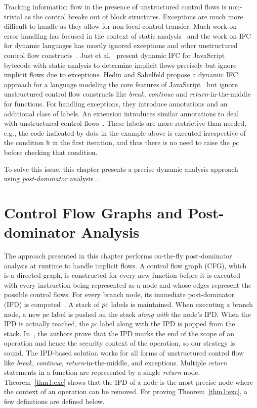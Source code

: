 Tracking information flow in the presence of unstructured control
flows is non-trivial as the control breaks out of block
structures. Exceptions are much more difficult to handle as they 
allow for non-local control transfer. Much work on error handling has
focused in the context of static analysis~\cite{myersJFlow,aslan_plas09}
and the work on IFC for dynamic languages has mostly ignored
exceptions and other unstructured control flow 
constructs~\cite{plas09,plas10,stagedIFC,guarnieri11ISSTA,acsac09}.
Just et al.~\cite{just11PLASTIC} present dynamic IFC for JavaScript
bytecode with static analysis to determine implicit flows precisely
but ignore implicit flows due to exceptions. Hedin and Sabelfeld
propose a dynamic IFC approach for a language 
modeling the core features of JavaScript~\cite{csf12} but ignore
unstructured control flow constructs like \emph{break},
\emph{continue} and \emph{return}-in-the-middle for functions. For
handling exceptions, they introduce annotations and an additional
class of labels. An extension introduces similar annotations to deal
with unstructured control flows~\cite{sac14}. These labels are more
restrictive than needed, e.g., the code indicated by dots in the
example above is executed irrespective of the condition \texttt{h} in
the first iteration, and thus there is no need to raise the $\mathit{pc}$
before checking that condition. 

To solve this issue, this chapter presents a precise dynamic
analysis approach using \emph{post-dominator}
analysis~\cite{denning82,just11PLASTIC}.  

\section{Control Flow Graphs and Post-dominator Analysis}
The approach presented in this chapter performs on-the-fly
post-dominator analysis at runtime to handle implicit
flows. A control flow graph (CFG), which is a directed graph, is
constructed for every new function before it is executed with every
instruction being represented as a node and whose edges represent the
possible control flows. For every branch node, its immediate
post-dominator (IPD) is
computed~\cite{denning82,just11PLASTIC,post14}. A stack of $\mathit{pc}$  
labels is maintained. When executing a branch node, a new $pc$ label
is pushed on the stack \emph{along with} the node's IPD. When the IPD
is actually reached, the $pc$ label along with the IPD is popped from
the stack. In~\cite{Xin,Masri}, the authors prove that the IPD marks the
end of the scope of an operation and hence the security context of the
operation, so our strategy is sound. The IPD-based solution works for all
forms of unstructured control flow like \emph{break}, \emph{continue},
\emph{return}-in-the-middle, and exceptions. Multiple \emph{return}
statements in a function are represented by a single \emph{return} 
node. Theorem~\ref{thm1:exc} shows that the IPD of a node is the most
precise node where the context of an operation can be removed. For
proving Theorem~\ref{thm1:exc}, a few definitions are defined below.

